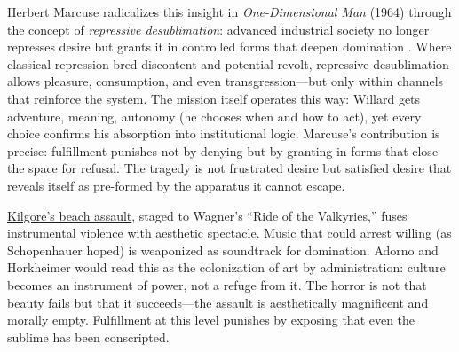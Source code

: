 Herbert Marcuse radicalizes this insight in \textit{One-Dimensional Man} (1964) through the
concept of \emph{repressive desublimation}: advanced industrial society no longer represses
desire but grants it in controlled forms that deepen domination \parencite{MarcuseOneDim1964}.
Where classical repression bred discontent and potential revolt, repressive desublimation
allows pleasure, consumption, and even transgression---but only within channels that reinforce
the system. The mission itself operates this way: Willard gets adventure, meaning, autonomy (he
chooses when and how to act), yet every choice confirms his absorption into institutional
logic. Marcuse's contribution is precise: fulfillment punishes not by denying but by granting
in forms that close the space for refusal. The tragedy is not frustrated desire but satisfied
desire that reveals itself as pre-formed by the apparatus it cannot escape.

\hyperref[scene:kilgore-beach]{Kilgore's beach assault}, staged to Wagner's ``Ride of the
Valkyries,'' fuses instrumental violence with aesthetic spectacle. Music that could arrest
willing (as Schopenhauer hoped) is weaponized as soundtrack for domination. Adorno and
Horkheimer would read this as the colonization of art by administration: culture becomes an
instrument of power, not a refuge
from it. The horror is not that beauty fails but that it succeeds---the assault is
aesthetically magnificent and morally empty. Fulfillment at this level punishes by exposing
that even the sublime has been conscripted.
